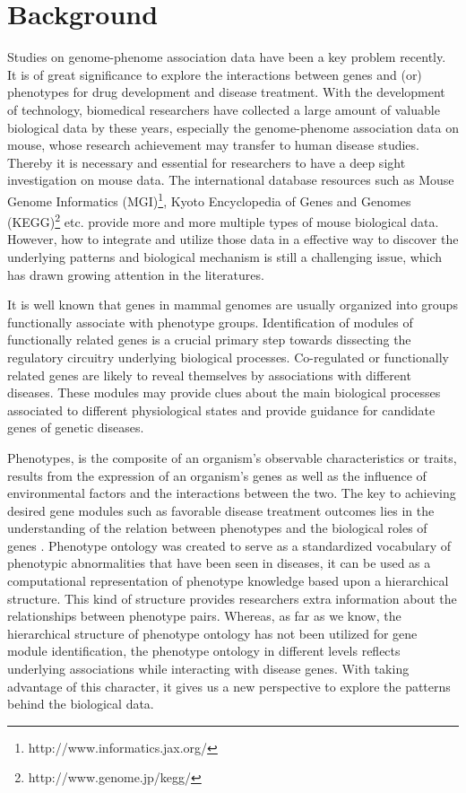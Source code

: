 \documentclass{bmcart}
\begin{document}
\section*{Background}
Studies on genome-phenome association data have been a key problem recently. It is of great significance to explore the interactions between genes and (or) phenotypes for drug development and disease treatment. With the development of technology, biomedical researchers have collected a large amount of valuable biological data by these years, especially the genome-phenome association data on mouse, whose research achievement may transfer to human disease studies. Thereby it is necessary and essential for researchers to have a deep sight investigation on mouse data. The international database resources such as Mouse Genome Informatics (MGI)\footnote{http://www.informatics.jax.org/}, Kyoto Encyclopedia of Genes and Genomes (KEGG)\footnote{http://www.genome.jp/kegg/} etc. provide more and more multiple types of mouse biological data. However, how to integrate and utilize those data in a effective way to discover the underlying patterns and biological mechanism is still a challenging issue, which has drawn growing attention in the literatures.

It is well known that genes in mammal genomes are usually organized into groups functionally associate with phenotype groups\cite{XuanH2015,Yao2011,Lage2007,Oti2006}. Identification of modules of functionally related genes is a crucial primary step towards dissecting the regulatory circuitry underlying biological processes. Co-regulated or functionally related genes are likely to reveal themselves by associations with different diseases. These modules may provide clues about the main biological processes associated to different physiological states and provide guidance for candidate genes of genetic diseases.

Phenotypes, is the composite of an organism's observable characteristics or traits, results from the expression of an organism's genes as well as the influence of environmental factors and the interactions between the two\cite{McKusick2007,PhilipGroth2006}. The key to achieving desired gene modules such as favorable disease treatment outcomes lies in the understanding of the relation between phenotypes and the biological roles of genes \cite{Sawyers2008,Rubin2008,Edwards2004}. Phenotype ontology was created to serve as a standardized vocabulary of phenotypic abnormalities that have been seen in diseases, it can be used as a computational representation of phenotype knowledge based upon a hierarchical structure\cite{Robinson2014,Kohler2014,Smith2009}. This kind of structure provides researchers extra information about the relationships between phenotype pairs. Whereas, as far as we know, the hierarchical structure of phenotype ontology has not been utilized for gene module identification, the phenotype ontology in different levels reflects underlying associations while interacting with disease genes. With taking advantage of this character, it gives us a new perspective to explore the patterns behind the biological data.
\end{document}
